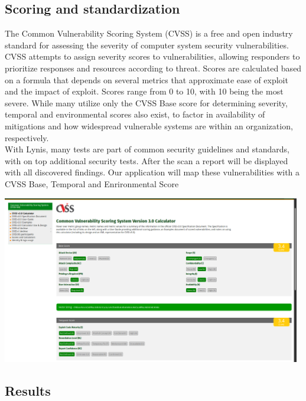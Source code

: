 \pagebreak

\subsection{Scoring and standardization}

The Common Vulnerability Scoring System (CVSS) is a free and open industry standard for assessing the severity of computer system security vulnerabilities. CVSS attempts to assign severity scores to vulnerabilities, allowing responders to prioritize responses and resources according to threat. Scores are calculated based on a formula that depends on several metrics that approximate ease of exploit and the impact of exploit. Scores range from 0 to 10, with 10 being the most severe. While many utilize only the CVSS Base score for determining severity, temporal and environmental scores also exist, to factor in availability of mitigations and how widespread vulnerable systems are within an organization, respectively.
\\ 
With Lynis, many tests are part of common security guidelines and standards,
with on top additional security tests. After the scan a report will be displayed
with all discovered findings. Our application will map these vulnerabilities with a CVSS Base, Temporal and Enrironmental Score 

\vspace{1cm}
\begin{center}
\includegraphics[width=0.98\textwidth]{images/cvss.png}
\end{center}
\pagebreak

\subsection{Results}

